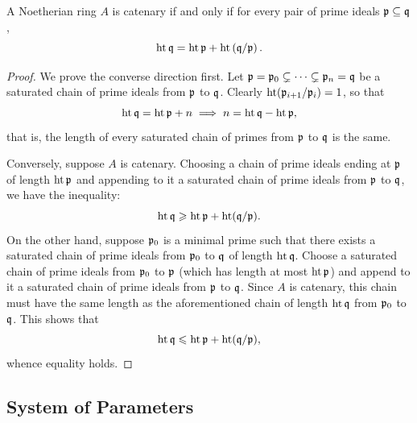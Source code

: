 \begin{lemma}
    A Noetherian ring $A$ is catenary if and only if for every pair of prime ideals $\mathfrak{p}\subseteq\mathfrak{q}$, 
    \begin{equation*}
        \operatorname{ht}\mathfrak{q} = \operatorname{ht}\mathfrak{p} + \operatorname{ht}\left(\mathfrak{q}/\mathfrak{p}\right).
    \end{equation*}
\end{lemma}
\begin{proof}
    We prove the converse direction first. Let $\mathfrak{p} = \mathfrak{p}_0\subsetneq\cdots\subsetneq\mathfrak{p}_n = \mathfrak{q}$ be a saturated chain of prime ideals from $\mathfrak{p}$ to $\mathfrak{q}$. Clearly $\operatorname{ht}(\mathfrak{p}_{i + 1}/\mathfrak{p}_i) = 1$, so that 
    \begin{equation*}
        \operatorname{ht}\mathfrak{q} = \operatorname{ht}\mathfrak{p} + n\implies n = \operatorname{ht}\mathfrak{q} - \operatorname{ht}\mathfrak{p},
    \end{equation*}
    that is, the length of every saturated chain of primes from $\mathfrak{p}$ to $\mathfrak{q}$ is the same. 

    Conversely, suppose $A$ is catenary. Choosing a chain of prime ideals ending at $\mathfrak{p}$ of length $\operatorname{ht}\mathfrak{p}$ and appending to it a saturated chain of prime ideals from $\mathfrak{p}$ to $\mathfrak{q}$, we have the inequality: 
    \begin{equation*}
        \operatorname{ht}\mathfrak{q}\geqslant\operatorname{ht}\mathfrak{p} + \operatorname{ht}(\mathfrak{q}/\mathfrak{p}).
    \end{equation*}
    On the other hand, suppose $\mathfrak{p}_0$ is a minimal prime such that there exists a saturated chain of prime ideals from $\mathfrak{p}_0$ to $\mathfrak{q}$ of length $\operatorname{ht}\mathfrak{q}$. Choose a saturated chain of prime ideals from $\mathfrak{p}_0$ to $\mathfrak{p}$ (which has length at most $\operatorname{ht}\mathfrak{p}$) and append to it a saturated chain of prime ideals from $\mathfrak{p}$ to $\mathfrak{q}$. Since $A$ is catenary, this chain must have the same length as the aforementioned chain of length $\operatorname{ht}\mathfrak{q}$ from $\mathfrak{p}_0$ to $\mathfrak{q}$. This shows that 
    \begin{equation*}
        \operatorname{ht}\mathfrak{q}\leqslant\operatorname{ht}\mathfrak{p} + \operatorname{ht}(\mathfrak{q}/\mathfrak{p}),
    \end{equation*}
    whence equality holds.
\end{proof}

\subsection{System of Parameters}

